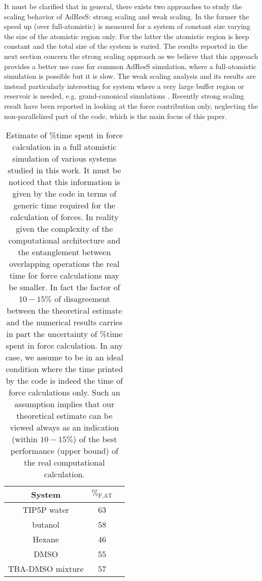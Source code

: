 \documentclass[a4paper,preprint,unsortedaddress]{revtex4-1}
\begin{document}
It must be clarified that in general, there exists two approaches to study the scaling behavior of AdResS: strong scaling and weak scaling. In the former the speed up (over full-atomistic) is measured for a system of constant size varying the size of the atomistic region only. For the latter the atomistic region is keep constant and the total size of the system is varied.
The results reported in the next section concern the strong scaling approach as we believe that this approach provides a better use case for common AdResS simulation, where a full-atomistic simulation is possible but it is slow.
The weak scaling analysis and its results are instead particularly interesting for system where a very large buffer region or reservoir is needed, e.g. grand-canonical simulations \cite{prx-han,jcp-anim,njp}.
Recently strong scaling result have been reported in \cite{Kreis} looking at the force contribution only, neglecting the non-parallelized part of the code, which is the main focus of this paper.

\begin{table}[]
\begin{center}
\begin{tabular}{ccc}
\hline \hline
 System &  $\%_\text{F,AT}$ \\
\hline
TIP5P water & 63 \\
butanol & 58  \\
Hexane & 46  \\
DMSO & 55 \\
TBA-DMSO mixture & 57 \\
\hline \hline
\end{tabular}
\caption{Estimate of \%time spent in force calculation in a full atomistic simulation of various systems studied in this work. It must be noticed that this information is given by the code in terms of generic time required for the calculation of forces. In reality given the complexity of the computational architecture and the entanglement between overlapping operations the real time for force calculations may be smaller. In fact the factor of $10-15 \%$ of disagreement between the theoretical estimate and the numerical results carries in part the uncertainty of \%time spent in force calculation. In any case, we assume to be in an ideal condition where the time printed by the code is indeed the time of force calculations only. Such an assumption implies that our theoretical estimate can be viewed always as an indication (within  $10-15 \%$) of the best performance (upper bound) of the real computational calculation.}
\label{force}
\end{center}
\end{table}
\end{document}

